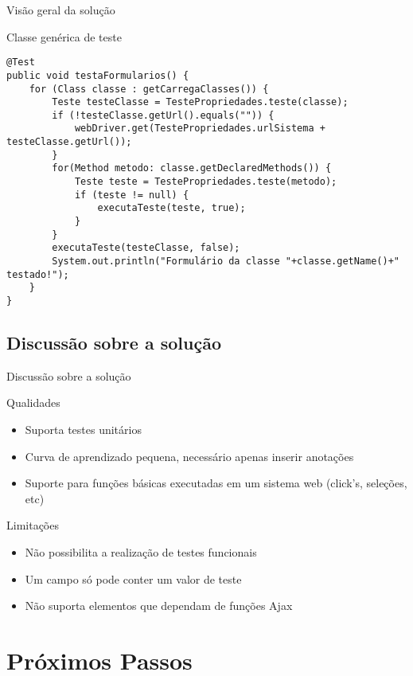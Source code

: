 \documentclass{beamer}
\begin{document}
\begin{frame}[fragile]{Visão geral da solução}
    \item Classe genérica de teste
    \begin{lstlisting}
@Test
public void testaFormularios() {
	for (Class classe : getCarregaClasses()) {
		Teste testeClasse = TestePropriedades.teste(classe);
        if (!testeClasse.getUrl().equals("")) {
            webDriver.get(TestePropriedades.urlSistema + testeClasse.getUrl());
        }
        for(Method metodo: classe.getDeclaredMethods()) {
            Teste teste = TestePropriedades.teste(metodo);
            if (teste != null) {
                executaTeste(teste, true);
            }
        }
        executaTeste(testeClasse, false);
        System.out.println("Formulário da classe "+classe.getName()+" testado!");
	}
}
	\end{lstlisting}
\end{frame}
\subsection{Discussão sobre a solução}
\begin{frame}{Discussão sobre a solução}
    \item Qualidades
    \begin{itemize}
		\item Suporta testes unitários
		\item Curva de aprendizado pequena, necessário apenas inserir anotações
		\item Suporte para funções básicas executadas em um sistema web (click's, seleções, etc)
	\end{itemize}
    \item Limitações
    \begin{itemize}
		\item Não possibilita a realização de testes funcionais
		\item Um campo só pode conter um valor de teste
		\item Não suporta elementos que dependam de funções Ajax
	\end{itemize}
\end{frame}
\section{Próximos Passos}
\end{document}
